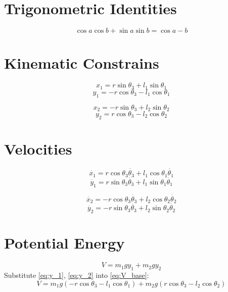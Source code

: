\documentclass[titlepage]{article}
\numberwithin{equation}{section}
\begin{document}
\section{Trigonometric Identities}
\begin{equation} \label{eq:ti1}
\cos a \cos b + \sin a \sin b = \cos{a - b}
\end{equation}

\pagebreak
\section{Kinematic Constrains}
\begin{equation} \label{eq:x_1}
x_1 = r \sin \theta_3 + l_1 \sin \theta_1
\end{equation}
\begin{equation} \label{eq:y_1}
y_1 = -r \cos \theta_3 - l_1 \cos \theta_1
\end{equation}

\begin{equation} \label{eq:x_2}
x_2 = -r \sin \theta_3 + l_2 \sin \theta_2
\end{equation}
\begin{equation} \label{eq:y_2}
y_2 = r \cos \theta_3 - l_2 \cos \theta_2
\end{equation}

\section{Velocities}
\begin{equation} \label{eq:x_1_dot}
\dot{x_1} = r \cos \theta_3 \dot{\theta_3} + l_1 \cos \theta_1 \dot{\theta_1}
\end{equation}
\begin{equation} \label{eq:y_1_dot}
\dot{y_1} = r \sin \theta_3 \dot{\theta_3} + l_1 \sin \theta_1 \dot{\theta_1}
\end{equation}

\begin{equation} \label{eq:x_2_dot}
\dot{x_2} = -r \cos \theta_3 \dot{\theta_3} + l_2 \cos \theta_2 \dot{\theta_2}
\end{equation}
\begin{equation} \label{eq:y_2_dot}
\dot{y_2} = -r \sin \theta_3 \dot{\theta_3} + l_2 \sin \theta_2 \dot{\theta_2}
\end{equation}

\section{Potential Energy}
\begin{equation} \label{eq:V_base}
V = m_1 g y_1 + m_2 g y_2
\end{equation}
Substitute \ref{eq:y_1}, \ref{eq:y_2} into \ref{eq:V_base}:
\begin{equation} \label{eq:V}
V = m_1 g (-r \cos \theta_3 - l_1 \cos \theta_1) + m_2 g (r \cos \theta_3 - l_2 \cos \theta_2)
\end{equation}
\end{document}
